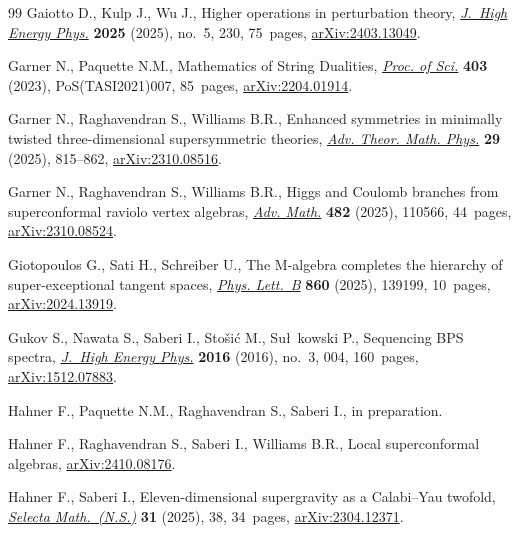 \documentclass[10pt,a4paper]{amsart}
\numberwithin{equation}{section}
\theoremstyle{definition}
\begin{document}
\begin{thebibliography}{99}
Gaiotto D., Kulp J., Wu J., Higher operations in perturbation theory,
 \href{https://doi.org/10.1007/jhep05(2025)230}{\textit{J.~High Energy Phys.}}
 \textbf{2025} (2025), no.~5, 230, 75~pages,
 \href{http://arxiv.org/abs/2403.13049}{arXiv:2403.13049}.

Garner N., Paquette N.M., Mathematics of String Dualities,
 \href{https://doi.org/10.22323/1.403.0007}{\textit{Proc. of Sci.}}
 \textbf{403} (2023), PoS(TASI2021)007, 85~pages,
 \href{http://arxiv.org/abs/2204.01914}{arXiv:2204.01914}.

Garner N., Raghavendran S., Williams B.R., Enhanced symmetries in minimally
 twisted three-dimensional supersymmetric theories,
 \href{https://doi.org/10.4310/atmp.250929221027}{\textit{Adv. Theor. Math.
 Phys.}} \textbf{29} (2025), 815--862,
 \href{http://arxiv.org/abs/2310.08516}{arXiv:2310.08516}.

Garner N., Raghavendran S., Williams B.R., Higgs and {C}oulomb branches from
 superconformal raviolo vertex algebras,
 \href{https://doi.org/10.1016/j.aim.2025.110566}{\textit{Adv. Math.}}
 \textbf{482} (2025), 110566, 44~pages,
 \href{http://arxiv.org/abs/2310.08524}{arXiv:2310.08524}.

Giotopoulos G., Sati H., Schreiber U., The {M}-algebra completes the hierarchy
 of super-exceptional tangent spaces,
 \href{https://doi.org/10.1016/j.physletb.2024.139199}{\textit{Phys. Lett.~B}}
 \textbf{860} (2025), 139199, 10~pages,
 \href{http://arxiv.org/abs/2024.13919}{arXiv:2024.13919}.

Gukov S., Nawata S., Saberi I., Sto\v{s}i\'c M., Su\l~kowski P., Sequencing
 {BPS} spectra, \href{https://doi.org/10.1007/JHEP03(2016)004}{\textit{J.~High
 Energy Phys.}} \textbf{2016} (2016), no.~3, 004, 160~pages,
 \href{http://arxiv.org/abs/1512.07883}{arXiv:1512.07883}.

Hahner F., Paquette N.M., Raghavendran S., Saberi I., {i}n
 preparation.

Hahner F., Raghavendran S., Saberi I., Williams B.R., Local superconformal
 algebras, \href{http://arxiv.org/abs/2410.08176}{arXiv:2410.08176}.

Hahner F., Saberi I., Eleven-dimensional supergravity as a {C}alabi--{Y}au
 twofold, \href{https://doi.org/10.1007/s00029-025-01024-x}{\textit{Selecta
 Math.~(N.S.)}} \textbf{31} (2025), 38, 34~pages,
 \href{http://arxiv.org/abs/2304.12371}{arXiv:2304.12371}.


\end{thebibliography}
\end{document}
